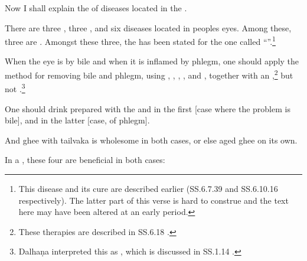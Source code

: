 \begin{translation}
    
    \item[1]  Now I shall explain the  of diseases
    located in the .
    
    \item[2]  There are three , three ,
    and six  diseases located in peoples eyes. Among these,
    three are . Amongst these three, %
    the  has been stated for the one called
    “”.\footnote{This disease and its cure are 
    described earlier (SS.6.7.39 and SS.6.10.16 
    \citep[609 and 614]{vulgate} respectively). The latter part of this verse is
    hard to construe and the text here may have been altered at an early period.}
    
    \item[3--5ab]  When the eye is  by bile and when it is 
    inflamed 
    by phlegm, one should apply the method for removing bile and phlegm, using 
    , 
    ,
    ,
    , and 
    ,
    together with an ,\footnote{These therapies are 
    described in 
    SS.6.18 
    \citep[633--640]{vulgate}.} but not 
    .\footnote{Dalhaṇa interpreted this as 
    , which is discussed in SS.1.14 \citep[]{vulgate}.}
    
    One should drink  prepared with the
 and in the first [case where the problem
is bile], and  in the latter
[case, of phlegm].
    
    And ghee with \gls{tailvaka} is wholesome in both cases, or else 
    aged ghee on its own.
    
    \item[5cd--7ab]
    
    In a , these four  are beneficial 
    in both cases:
    \begin{itemize}
        

\end{itemize}
\end{translation}
